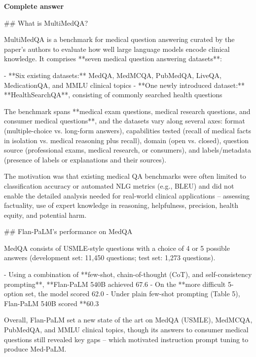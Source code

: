 \documentclass[10pt]{article}
\begin{document}
\textbf{Complete answer}
\begin{AnswerText}
## What is MultiMedQA?

MultiMedQA is a benchmark for medical question answering curated by the paper's authors to evaluate how well large language models encode clinical knowledge. It comprises **seven medical question answering datasets**:

- **Six existing datasets:** MedQA, MedMCQA, PubMedQA, LiveQA, MedicationQA, and MMLU clinical topics
- **One newly introduced dataset:** **HealthSearchQA**, consisting of commonly searched health questions

The benchmark spans **medical exam questions, medical research questions, and consumer medical questions**, and the datasets vary along several axes: format (multiple-choice vs. long-form answers), capabilities tested (recall of medical facts in isolation vs. medical reasoning plus recall), domain (open vs. closed), question source (professional exams, medical research, or consumers), and labels/metadata (presence of labels or explanations and their sources).

The motivation was that existing medical QA benchmarks were often limited to classification accuracy or automated NLG metrics (e.g., BLEU) and did not enable the detailed analysis needed for real-world clinical applications -- assessing factuality, use of expert knowledge in reasoning, helpfulness, precision, health equity, and potential harm.

## Flan-PaLM's performance on MedQA

MedQA consists of USMLE-style questions with a choice of 4 or 5 possible answers (development set: 11,450 questions; test set: 1,273 questions).

- Using a combination of **few-shot, chain-of-thought (CoT), and self-consistency prompting**, **Flan-PaLM 540B achieved 67.6%
- On the **more difficult 5-option set, the model scored 62.0%
- Under plain few-shot prompting (Table 5), Flan-PaLM 540B scored **60.3%

Overall, Flan-PaLM set a new state of the art on MedQA (USMLE), MedMCQA, PubMedQA, and MMLU clinical topics, though its answers to consumer medical questions still revealed key gaps -- which motivated instruction prompt tuning to produce Med-PaLM.
\end{AnswerText}
\end{document}
